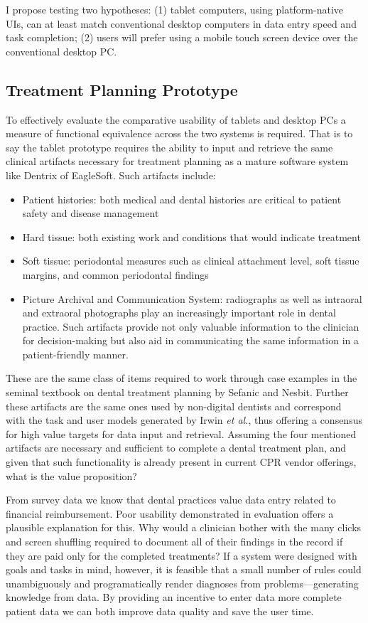 \documentclass[11pt]{article}
\begin{document}
I propose testing two hypotheses: (1) tablet computers, using platform-native UIs, can at least match conventional desktop computers in data entry speed and task completion; (2) users will prefer using a mobile touch screen device over the conventional desktop PC.

\subsection{Treatment Planning Prototype}

To effectively evaluate the comparative usability of tablets and desktop PCs a measure of functional equivalence across the two systems is required. That is to say the tablet prototype requires the ability to input and retrieve the same clinical artifacts necessary for treatment planning as a mature software system like Dentrix of EagleSoft. Such artifacts include:
\begin{itemize}
\item Patient histories: both medical and dental histories are critical to patient safety and disease management
\item Hard tissue: both existing work and conditions that would indicate treatment
\item Soft tissue: periodontal measures such as clinical attachment level, soft tissue margins, and common periodontal findings
\item Picture Archival and Communication System: radiographs as well as intraoral and extraoral photographs play an increasingly important role in dental practice. Such artifacts provide not only valuable information to the clinician for decision-making but also aid in communicating the same information in a patient-friendly manner.
\end{itemize}
These are the same class of items required to work through case examples in the seminal textbook on dental treatment planning by Sefanic and Nesbit\cite{Stefanac2006Treatment-Plann}. Further these artifacts are the same ones used by non-digital dentists and correspond with the task and user models generated by Irwin \textit{et al.}, thus offering a consensus for high value targets for data input and retrieval. Assuming the four mentioned artifacts are necessary and sufficient to complete a dental treatment plan, and given that such functionality is already present in current CPR vendor offerings, what is the value proposition?

From survey data we know that dental practices value data entry related to financial reimbursement. Poor usability demonstrated in evaluation offers a plausible explanation for this. Why would a clinician bother with the many clicks and screen shuffling required to document all of their findings in the record if they are paid only for the completed treatments? If a system were designed with goals and tasks in mind, however, it is feasible that a small number of rules could unambiguously and programatically render diagnoses from problems---generating knowledge from data. By providing an incentive to enter data more complete patient data we can both improve data quality and save the user time.
\end{document}
